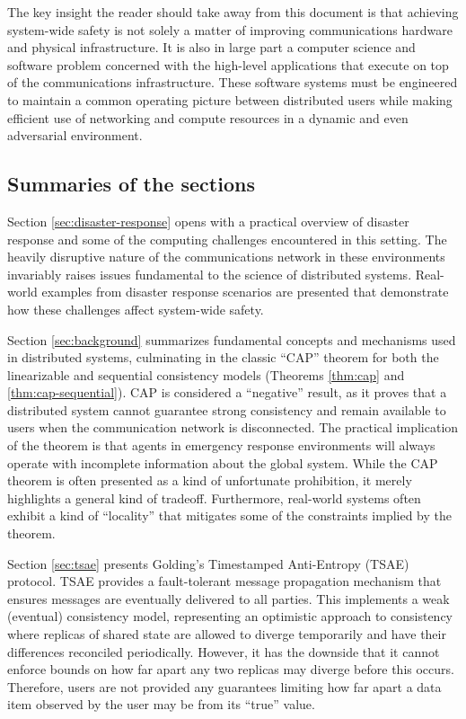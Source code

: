 \documentclass[]             %
{NASA}                       %
\theoremstyle{definition}
\begin{document}
The key insight the reader should take away from this document is that
achieving system-wide safety is not solely a matter of improving
communications hardware and physical infrastructure. It is also in
large part a computer science and software problem concerned with the
high-level applications that execute on top of the communications
infrastructure. These software systems must be engineered to maintain
a common operating picture between distributed users while making
efficient use of networking and compute resources in a dynamic and
even adversarial environment.

\subsection{Summaries of the sections}
\label{ssec:summaries-of-the-sections}
Section \ref{sec:disaster-response} opens with a practical overview of
disaster response and some of the computing challenges encountered in
this setting. The heavily disruptive nature of the communications
network in these environments invariably raises issues fundamental to
the science of distributed systems. Real-world examples from disaster
response scenarios are presented that demonstrate how these challenges
affect system-wide safety.

Section \ref{sec:background} summarizes fundamental concepts and
mechanisms used in distributed systems, culminating in the classic
``CAP'' theorem for both the linearizable and sequential consistency
models (Theorems \ref{thm:cap} and \ref{thm:cap-sequential}). CAP is
considered a ``negative'' result, as it proves that a distributed
system cannot guarantee strong consistency and remain available to
users when the communication network is disconnected. The practical
implication of the theorem is that agents in emergency response
environments will always operate with incomplete information about the
global system.  While the CAP theorem is often presented as a kind of
unfortunate prohibition, it merely highlights a general kind of
tradeoff. Furthermore, real-world systems often exhibit a kind of
``locality'' that mitigates some of the constraints implied by the
theorem.

Section \ref{sec:tsae} presents Golding's Timestamped Anti-Entropy
(TSAE) protocol. TSAE provides a fault-tolerant message propagation
mechanism that ensures messages are eventually delivered to all
parties. This implements a weak (eventual) consistency model,
representing an optimistic approach to consistency where replicas of
shared state are allowed to diverge temporarily and have their
differences reconciled periodically. However, it has the downside that
it cannot enforce bounds on how far apart any two replicas may diverge
before this occurs. Therefore, users are not provided any guarantees
limiting how far apart a data item observed by the user may be from
its ``true'' value.
\end{document}
